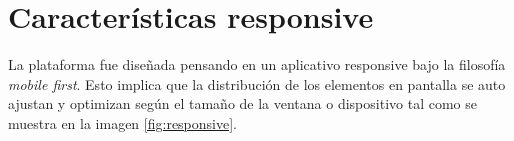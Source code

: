\documentclass[11pt,letterpaper]{article}
\begin{document}
\section{Características responsive}
La plataforma fue diseñada pensando en un aplicativo responsive bajo la filosofía {\it mobile first}. Esto implica que la distribución de los elementos en pantalla se auto ajustan y optimizan según el tamaño de la ventana o dispositivo tal como se muestra en la imagen \ref{fig:responsive}. 



\end{document}
